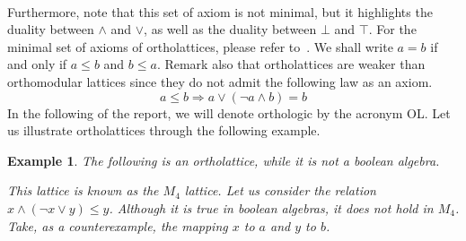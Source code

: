 \documentclass[a4paper, 11pt]{article}
\newtheorem{example}[theorem]{Example}
\begin{document}
    \\
    Furthermore, note that this set of axiom is not minimal, but it highlights the duality between 
    $\wedge$ and
    $\vee$, as well as the duality between $\bot$ and $\top$. For the minimal set of axioms of 
    ortholattices, please refer to~\cite{MCCUNE1998285}. We shall write $a=b$ if and only if $a\leq b$ 
    and $b\leq a$. Remark also that ortholattices are weaker than orthomodular lattices since they do 
    not admit the following law as an axiom.
    \[
	    a\leq b\Rightarrow a\vee(\neg a\wedge b)=b
    \]
    In the following of the report, we will denote orthologic by the acronym OL. Let us illustrate
    ortholattices through the following example. 
    \begin{example}
	    \label{example1}
	    The following is an ortholattice, while it is not a boolean algebra.
	    \begin{center}
	    \end{center}
	    This lattice is known as the $M_4$ lattice. Let us consider the relation 
	    $x\wedge(\neg x\vee y)\leq y$. Although it is true in boolean algebras, it does not hold in 
	    $M_4$. Take, as a counterexample, the mapping $x$ to $a$ and $y$ to $b$.
    \end{example}
\end{document}
